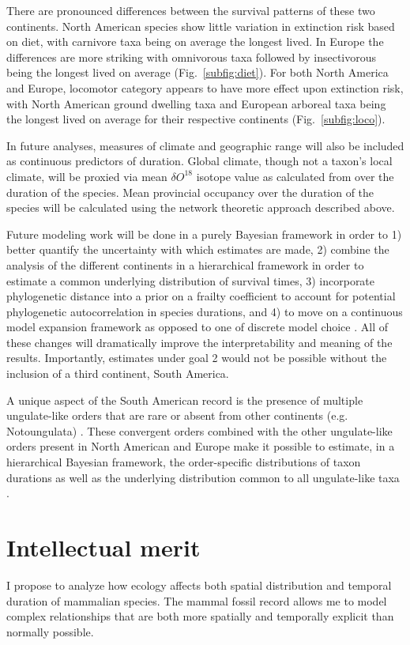 \documentclass[11pt,letterpaper]{article}
\begin{document}
There are pronounced differences between the survival patterns of these two continents. North American species show little variation in extinction risk based on diet, with carnivore taxa being on average the longest lived. In Europe the differences are more striking with omnivorous taxa followed by insectivorous being the longest lived on average (Fig.~\ref{subfig:diet}). For both North America and Europe, locomotor category appears to have more effect upon extinction risk, with North American ground dwelling taxa and European arboreal taxa being the longest lived on average for their respective continents (Fig.~\ref{subfig:loco}).

In future analyses, measures of climate and geographic range will also be included as continuous predictors of duration. Global climate, though not a taxon's local climate, will be proxied via mean \(\delta O^{18}\) isotope value as calculated from \citet{Zachos2008} over the duration of the species. Mean provincial occupancy over the duration of the species will be calculated using the network theoretic approach described above.

Future modeling work will be done in a purely Bayesian framework in order to 1) better quantify the uncertainty with which estimates are made, 2) combine the analysis of the different continents in a hierarchical framework in order to estimate a common underlying distribution of survival times, 3) incorporate phylogenetic distance into a prior on a frailty coefficient \citep{Banerjee2003a,Ibrahim2001} to account for potential phylogenetic autocorrelation in species durations, and 4) to move on a continuous model expansion framework as opposed to one of discrete model choice \citep{Gelman2013d}. All of these changes will dramatically improve the interpretability and meaning of the results. Importantly, estimates under goal 2 would not be possible without the inclusion of a third continent, South America. 

A unique aspect of the South American record is the presence of multiple ungulate-like orders that are rare or absent from other continents (e.g. Notoungulata) \citep{Marshall1982,Macfadden1997,Macfadden2006,Flynn1998a}. These convergent orders combined with the other ungulate-like orders present in North American and Europe make it possible to estimate, in a hierarchical Bayesian framework, the order-specific distributions of taxon durations as well as the underlying distribution common to all ungulate-like taxa \citep{Gelman2013d}.

\section{Intellectual merit}
I propose to analyze how ecology affects both spatial distribution and temporal duration of mammalian species. The mammal fossil record allows me to model complex relationships that are both more spatially and temporally explicit than normally possible.
\end{document}

